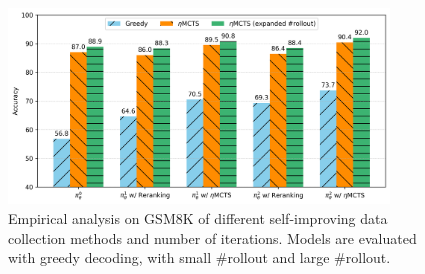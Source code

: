 \begin{figure}[!tbp]
    \centering
    \includegraphics[width=0.9\textwidth]{figures/model_self_improving_n_rounds_results_v2.png}
    \caption{Empirical analysis on GSM8K of different self-improving data collection methods and number of iterations. Models are evaluated with greedy decoding, \emcts{} with small \#rollout and large \#rollout. }
    \label{fig:self_improving_ablations}
\end{figure}